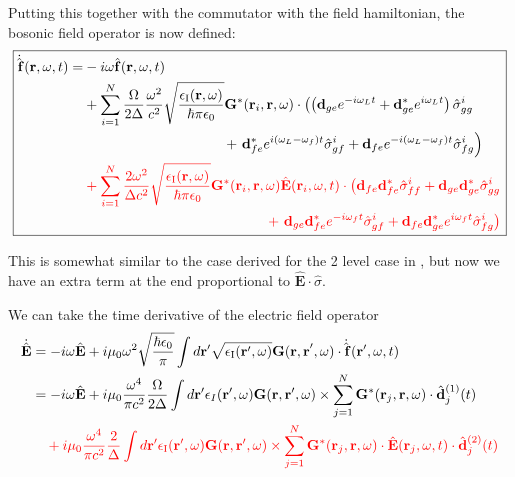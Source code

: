 \documentclass[a4paper, 11pt]{article}
\numberwithin{equation}{section}
\begin{document}
Putting this together with the commutator with the field hamiltonian, the bosonic
field operator is now defined:
\begin{equation}\boxed{
\begin{aligned}
\dot{\hat{\mathbf{f}}}(\mathbf{r}, \omega, t) = &-i\omega\hat{\mathbf{f}}(\mathbf{r}, \omega,
  t)\\ &+ \sum_{i=1}^N \frac{\Omega}{2\Delta}
  \frac{\omega^2}{c^2} \sqrt{\frac{\epsilon_\text{I}(\mathbf{r,
  \omega})}{\hbar\pi\epsilon_0}} \mathbf{G}^*(\mathbf{r}_i, \mathbf{r}, \omega) \cdot
  \left( \left(\mathbf{d}_{ge}e^{-i\omega_Lt} +
  \mathbf{d}_{ge}^*e^{i\omega_Lt}\right) \hat{\sigma}_{gg}^i
  \right.\\&\hspace{10em}+\left. \mathbf{d}_{fe}^*e^{i(\omega_L-\omega_f)t}\hat{\sigma}_{gf}^i+
  \mathbf{d}_{fe}e^{-i(\omega_L-\omega_f)t}\hat{\sigma}_{fg}^i\right)\\&\color{red}+ \sum_{i=1}^N \frac{2
  \omega^2}{\Delta c^2} \sqrt{\frac{\epsilon_\text{I}(\mathbf{r},
  \omega)}{\hbar\pi\epsilon_0}} \mathbf{G}^*(\mathbf{r}_i, \mathbf{r},
  \omega)\hat{\mathbf{E}}(\mathbf{r}_i, \omega, t) \cdot \left( \mathbf{d}_{fe}
  \mathbf{d}_{fe}^*\hat\sigma_{ff}^i + \mathbf{d}_{ge}
    \mathbf{d}_{ge}^*\hat\sigma_{gg}^i \right.\\&\color{red}\hspace{13em}+ \left.\mathbf{d}_{ge}
    \mathbf{d}_{fe}^*e^{-i\omega_ft}\hat\sigma_{gf}^i + \mathbf{d}_{fe}
  \mathbf{d}_{ge}^*e^{i\omega_ft}\hat\sigma_{fg}^i \right)
\end{aligned}}
\end{equation}

This is somewhat similar to the case derived for the 2 level case in
\cite{PhysRevA.66.063810}, but now we have an extra term at the end proportional to
$\hat{\mathbf{E}}\cdot\hat{\sigma}$.\\\vspace{1em}


We can take the time derivative of the electric field operator
\begin{align*}
  \dot{\hat{\mathbf{E}}} &= -i\omega\hat{\mathbf{E}} + i\mu_0\omega^2\sqrt{\frac{\hbar\epsilon_0}{\pi}} \int
  d\mathbf{r}'\sqrt{\epsilon_{\text{I}}(\mathbf{r}',\omega)}\mathbf{G(r,r}',\omega)
  \cdot\dot{\hat{\mathbf{f}}}(\mathbf{r}',\omega, t)\\&= -i\omega\hat{\mathbf{E}}+
  i\mu_0
  \frac{\omega^4}{\pi c^2}\frac{\Omega}{2\Delta}\int d\mathbf{r}'
  \epsilon_I(\mathbf{r}',\omega)
  \mathbf{G}(\mathbf{r, r'}, \omega) \times \sum_{j=1}^N \mathbf{G}^*(\mathbf{r}_j,
  \mathbf{r}, \omega)\cdot \hat{\mathbf{d}}^{(1)}_j(t) \\&\color{red}\hspace{1em}+ i\mu_0
  \frac{\omega^4}{\pi c^2}\frac{2}{\Delta} \int d\mathbf{r}'\epsilon_\text{I}(\mathbf{r}',
  \omega)\mathbf{G}(\mathbf{r, r}', \omega) \times \sum_{j=1}^N
  \mathbf{G}^*(\mathbf{r}_j, \mathbf{r}, \omega)\cdot \hat{\mathbf{E}}(\mathbf{r}_j,
  \omega, t) \cdot \hat{\mathbf{d}}^{(2)}_{j}(t)
\end{align*}
\end{document}
